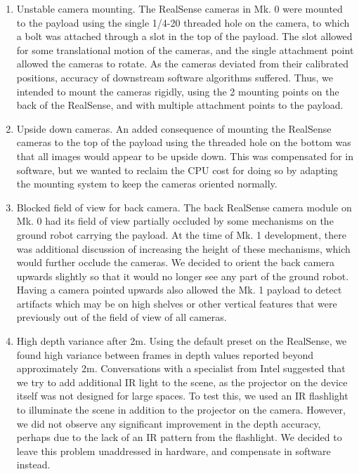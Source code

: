 \begin{enumerate}
	\item Unstable camera mounting. The RealSense cameras in Mk. 0 were mounted to the payload using the single 1/4-20 threaded hole on the camera, to which a bolt was attached through a slot in the top of the payload. The slot allowed for some translational motion of the cameras, and the single attachment point allowed the cameras to rotate. As the cameras deviated from their calibrated positions, accuracy of downstream software algorithms suffered. Thus, we intended to mount the cameras rigidly, using the 2 mounting points on the back of the RealSense, and with multiple attachment points to the payload.
	\item Upside down cameras. An added consequence of mounting the RealSense cameras to the top of the payload using the threaded hole on the bottom was that all images would appear to be upside down. This was compensated for in software, but we wanted to reclaim the CPU cost for doing so by adapting the mounting system to keep the cameras oriented normally.
	\item Blocked field of view for back camera. The back RealSense camera module on Mk. 0 had its field of view partially occluded by some mechanisms on the ground robot carrying the payload. At the time of Mk. 1 development, there was additional discussion of increasing the height of these mechanisms, which would further occlude the cameras. We decided to orient the back camera upwards slightly so that it would no longer see any part of the ground robot. Having a camera pointed upwards also allowed the Mk. 1 payload to detect artifacts which may be on high shelves or other vertical features that were previously out of the field of view of all cameras.
	\item High depth variance after 2m. Using the default preset on the RealSense, we found high variance between frames in depth values reported beyond approximately 2m. Conversations with a specialist from Intel suggested that we try to add additional IR light to the scene, as the projector on the device itself was not designed for large spaces. To test this, we used an IR flashlight to illuminate the scene in addition to the projector on the camera. However, we did not observe any significant improvement in the depth accuracy, perhaps due to the lack of an IR pattern from the flashlight. We decided to leave this problem unaddressed in hardware, and compensate in software instead.
\end{enumerate}


